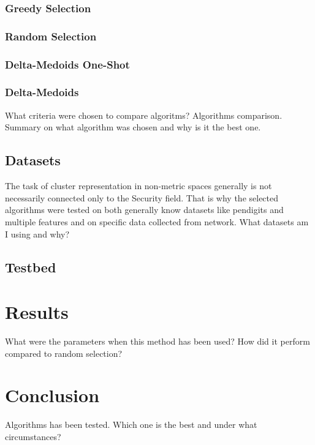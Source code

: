 \documentclass[thesis=B,english]{FITthesis}[2012/10/20]
\begin{document}
\subsection{Greedy Selection} %

\subsection{Random Selection}

\subsection{Delta-Medoids One-Shot}

\subsection{Delta-Medoids}

What criteria were chosen to compare algoritms?
Algorithms comparison.
Summary on what algorithm was chosen and why is it the best one.

\section{Datasets}
The task of cluster representation in non-metric spaces generally is not necessarily connected only to the Security field.
That is why the selected algorithms were tested on both generally know datasets like pendigits and multiple features and on specific data collected from network.
What datasets am I using and why?

\section{Testbed}

\chapter{Results}

What were the parameters when this method has been used?
How did it perform compared to random selection?


\chapter{Conclusion}
Algorithms has been tested.
Which one is the best and under what circumstances?
\end{document}
